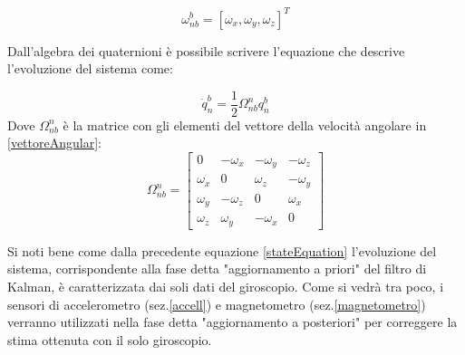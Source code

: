 \begin{equation}
\label{vettoreAngular}
\omega_{nb}^b  = [\omega_x, \omega_y, \omega_z]^T
\end{equation}

Dall'algebra dei quaternioni è possibile scrivere l'equazione che descrive l'evoluzione del sistema come:

\begin{equation}
\label{stateEquation}
\dot{q}_{n}^b = \frac{1}{2} \Omega_{nb}^n q_n^b
\end{equation}
Dove $\Omega_{nb}^n$ è la matrice con gli elementi del vettore della velocità angolare in \ref{vettoreAngular}:
\begin{equation}
\Omega_{nb}^n= \begin{bmatrix}
0 &  -\omega_x &  -\omega_y & -\omega_z\\
\omega_x     & 0  & \omega_z &  -\omega_y  \\
 \omega_y & -\omega_z  & 0 &  \omega_x \\
 \omega_z & \omega_y & -\omega_x & 0
\end{bmatrix}
\end{equation}

Si noti bene come dalla precedente equazione \ref{stateEquation} l'evoluzione del sistema, corrispondente alla fase detta "aggiornamento a priori" del filtro di Kalman, è caratterizzata dai soli dati del giroscopio. Come si vedrà tra poco, i sensori di accelerometro (sez.\ref{accell}) e magnetometro (sez.\ref{magnetometro}) verranno utilizzati nella fase detta "aggiornamento a posteriori" per correggere la stima ottenuta con il solo giroscopio.

